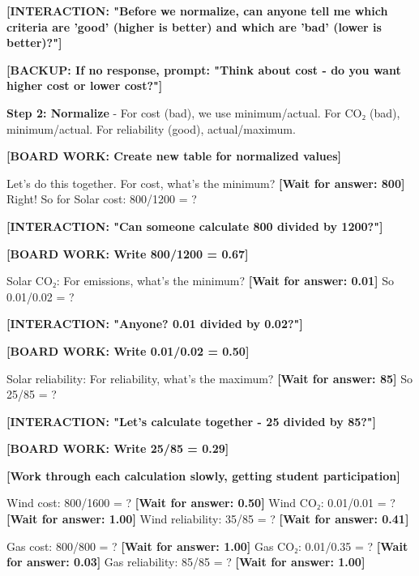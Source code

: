\documentclass[12pt]{article}
\begin{document}
\textcolor{speakernote}{\textbf{[INTERACTION: "Before we normalize, can anyone tell me which criteria are 'good' (higher is better) and which are 'bad' (lower is better)?"]}}

\textcolor{speakernote}{\textbf{[BACKUP: If no response, prompt: "Think about cost - do you want higher cost or lower cost?"]}}

\textcolor{emphasis}{\textbf{Step 2: Normalize}} - For cost (bad), we use minimum/actual. For CO₂ (bad), minimum/actual. For reliability (good), actual/maximum.

\textcolor{speakernote}{\textbf{[BOARD WORK: Create new table for normalized values]}}

Let's do this together. For cost, what's the minimum? \textcolor{speakernote}{\textbf{[Wait for answer: 800]}} Right! So for Solar cost: 800/1200 = ?

\textcolor{speakernote}{\textbf{[INTERACTION: "Can someone calculate 800 divided by 1200?"]}}

\textcolor{speakernote}{\textbf{[BOARD WORK: Write 800/1200 = 0.67]}}

Solar CO₂: For emissions, what's the minimum? \textcolor{speakernote}{\textbf{[Wait for answer: 0.01]}} So 0.01/0.02 = ?

\textcolor{speakernote}{\textbf{[INTERACTION: "Anyone? 0.01 divided by 0.02?"]}}

\textcolor{speakernote}{\textbf{[BOARD WORK: Write 0.01/0.02 = 0.50]}}

Solar reliability: For reliability, what's the maximum? \textcolor{speakernote}{\textbf{[Wait for answer: 85]}} So 25/85 = ?

\textcolor{speakernote}{\textbf{[INTERACTION: "Let's calculate together - 25 divided by 85?"]}}

\textcolor{speakernote}{\textbf{[BOARD WORK: Write 25/85 = 0.29]}}

\textcolor{speakernote}{\textbf{[Work through each calculation slowly, getting student participation]}}

Wind cost: 800/1600 = ? \textcolor{speakernote}{\textbf{[Wait for answer: 0.50]}}
Wind CO₂: 0.01/0.01 = ? \textcolor{speakernote}{\textbf{[Wait for answer: 1.00]}}
Wind reliability: 35/85 = ? \textcolor{speakernote}{\textbf{[Wait for answer: 0.41]}}

Gas cost: 800/800 = ? \textcolor{speakernote}{\textbf{[Wait for answer: 1.00]}}
Gas CO₂: 0.01/0.35 = ? \textcolor{speakernote}{\textbf{[Wait for answer: 0.03]}}
Gas reliability: 85/85 = ? \textcolor{speakernote}{\textbf{[Wait for answer: 1.00]}}
\end{document}
